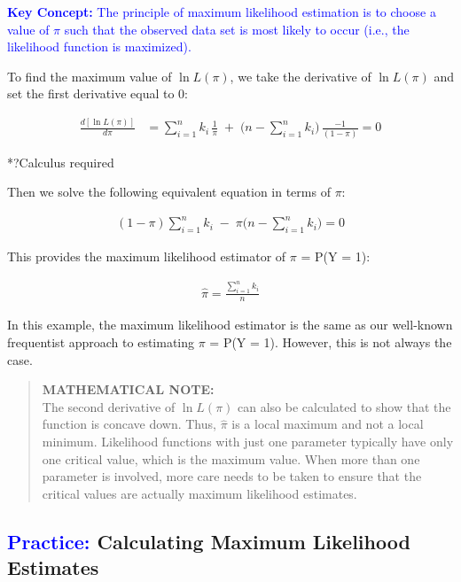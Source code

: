 \documentclass[
]{report}
\begin{document}
\textbf{\textcolor{blue}{Key Concept:}}
\textcolor{blue}{The principle of maximum likelihood estimation is to choose a value of $\scriptstyle \pi$ such that the observed data set is most likely to occur (i.e., the likelihood function is maximized). }

To find the maximum value of \(\scriptstyle \ln L(\pi)\), we take the derivative of \(\scriptstyle \ln L(\pi)\) and set the first derivative equal to 0:

\begin{align}
\frac{d[\ln L(\pi)]}{d\pi}
&= \sum_{i=1}^n k_i \,\frac{1}{\pi} \;+\;\bigl(n - \sum_{i=1}^n k_i\bigr)\,\frac{-1}{(1 - \pi)} = 0
\tag{6.29}
\end{align}

*?Calculus required

Then we solve the following equivalent equation in terms of \(\scriptstyle \pi\):

\begin{align}
(1 - \pi)\sum_{i=1}^n k_i \;-\;\pi\bigl(n - \sum_{i=1}^n k_i\bigr) = 0
\tag{6.30}
\end{align}

This provides the maximum likelihood estimator of \(\scriptstyle \pi\) = P(Y = 1):

\begin{align}
\displaystyle \hat{\pi} = \frac{\sum_{i=1}^n k_i}{n}
\tag{6.31}
\end{align}

In this example, the maximum likelihood estimator is the same as our well-known frequentist approach to estimating \(\scriptstyle \pi\) = P(Y = 1). However, this is not always the case.

\begin{quote}
\textbf{MATHEMATICAL NOTE:}\\
The second derivative of \(\scriptstyle \ln L(\pi)\) can also be calculated to show that the function is concave down. Thus, \(\scriptstyle \hat{\pi}\) is a local maximum and not a local minimum. Likelihood functions with just one parameter typically have only one critical value, which is the maximum value. When more than one parameter is involved, more care needs to be taken to ensure that the critical values are actually maximum likelihood estimates.
\end{quote}

\hypertarget{calculating-maximum-likelihood-estimates}{%
\subsection*{\texorpdfstring{\textcolor{blue}{Practice:} Calculating Maximum Likelihood Estimates}{ Calculating Maximum Likelihood Estimates}}\label{calculating-maximum-likelihood-estimates}}
\end{document}
